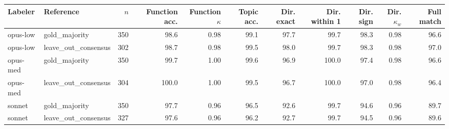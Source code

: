 \begin{tabular}{llrrrrrrrrr}
\toprule
Labeler & Reference & $n$ & Function acc. & Function $\kappa$ & Topic acc. & Dir. exact & Dir. within 1 & Dir. sign & Dir. $\kappa_w$ & Full match \\
\midrule
opus-low & gold\_majority & 350 & 98.6 & 0.98 & 99.1 & 97.7 & 99.7 & 98.3 & 0.98 & 96.6 \\
opus-low & leave\_out\_consensus & 302 & 98.7 & 0.98 & 99.5 & 98.0 & 99.7 & 98.3 & 0.98 & 97.0 \\
opus-med & gold\_majority & 350 & 99.7 & 1.00 & 99.6 & 96.9 & 100.0 & 97.4 & 0.98 & 96.6 \\
opus-med & leave\_out\_consensus & 304 & 100.0 & 1.00 & 99.5 & 96.7 & 100.0 & 97.0 & 0.98 & 96.4 \\
sonnet & gold\_majority & 350 & 97.7 & 0.96 & 96.5 & 92.6 & 99.7 & 94.6 & 0.96 & 89.7 \\
sonnet & leave\_out\_consensus & 327 & 97.6 & 0.96 & 96.2 & 92.7 & 99.7 & 94.5 & 0.96 & 89.6 \\
\bottomrule
\end{tabular}
